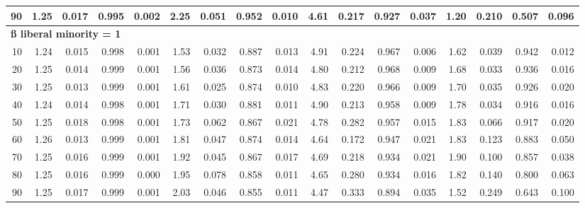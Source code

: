 \documentclass[
]{article}
\begin{document}
\begin{table}[H]
{\begin{tabular}{r|r|r|r|r|r|r|r|r|r|r|r|r|r|r|r|r}
\hline
\hspace{1em}90 & 1.25 & 0.017 & 0.995 & 0.002 & 2.25 & 0.051 & 0.952 & 0.010 & 4.61 & 0.217 & 0.927 & 0.037 & 1.20 & 0.210 & 0.507 & 0.096\\
\hline
\multicolumn{17}{l}{\textbf{ß liberal minority = 1}}\\
\hline
\hspace{1em}10 & 1.24 & 0.015 & 0.998 & 0.001 & 1.53 & 0.032 & 0.887 & 0.013 & 4.91 & 0.224 & 0.967 & 0.006 & 1.62 & 0.039 & 0.942 & 0.012\\
\hline
\hspace{1em}20 & 1.25 & 0.014 & 0.999 & 0.001 & 1.56 & 0.036 & 0.873 & 0.014 & 4.80 & 0.212 & 0.968 & 0.009 & 1.68 & 0.033 & 0.936 & 0.016\\
\hline
\hspace{1em}30 & 1.25 & 0.013 & 0.999 & 0.001 & 1.61 & 0.025 & 0.874 & 0.010 & 4.83 & 0.220 & 0.966 & 0.009 & 1.70 & 0.035 & 0.926 & 0.020\\
\hline
\hspace{1em}40 & 1.24 & 0.014 & 0.998 & 0.001 & 1.71 & 0.030 & 0.881 & 0.011 & 4.90 & 0.213 & 0.958 & 0.009 & 1.78 & 0.034 & 0.916 & 0.016\\
\hline
\hspace{1em}50 & 1.25 & 0.018 & 0.998 & 0.001 & 1.73 & 0.062 & 0.867 & 0.021 & 4.78 & 0.282 & 0.957 & 0.015 & 1.83 & 0.066 & 0.917 & 0.020\\
\hline
\hspace{1em}60 & 1.26 & 0.013 & 0.999 & 0.001 & 1.81 & 0.047 & 0.874 & 0.014 & 4.64 & 0.172 & 0.947 & 0.021 & 1.83 & 0.123 & 0.883 & 0.050\\
\hline
\hspace{1em}70 & 1.25 & 0.016 & 0.999 & 0.001 & 1.92 & 0.045 & 0.867 & 0.017 & 4.69 & 0.218 & 0.934 & 0.021 & 1.90 & 0.100 & 0.857 & 0.038\\
\hline
\hspace{1em}80 & 1.25 & 0.016 & 0.999 & 0.000 & 1.95 & 0.078 & 0.858 & 0.011 & 4.65 & 0.280 & 0.934 & 0.016 & 1.82 & 0.140 & 0.800 & 0.063\\
\hline
\hspace{1em}90 & 1.25 & 0.017 & 0.999 & 0.001 & 2.03 & 0.046 & 0.855 & 0.011 & 4.47 & 0.333 & 0.894 & 0.035 & 1.52 & 0.249 & 0.643 & 0.100\\
\hline
\end{tabular}}\begin{table}
\centering
{}
\end{table}
\end{table}
\end{document}
